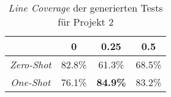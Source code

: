 \bgroup
\def\arraystretch{2}
\begin{table}[H]
	\vspace{.5cm}
	\centering		
	\begin{center}
		\begin{tabular}{|c||c|c|c|}
			\hline 
			& 0 & 0.25 & 0.5 \\
			\hline 
			\hline
			\textit{Zero-Shot} & 82.8\% & 61.3\% & 68.5\% \\
			\hline
			\textit{One-Shot} & 76.1\% & \textbf{84.9\%} & 83.2\% \\
			\hline
		\end{tabular} 
	\end{center}
	\caption{\textit{Line Coverage} der generierten Tests für Projekt 2}
	\label{fig:line-2}
	\vspace{-.8cm}
\end{table}
\egroup